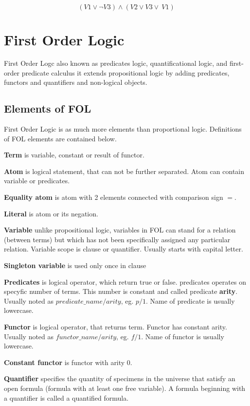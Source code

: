\begin{equation} \label{eg:PL_1}
  (V1 \lor \neg V3) \land (V2 \lor  V3 \lor ~V1)
\end{equation}


\section{First Order Logic}

First Order Logc also known as predicates logic, quantificational logic, and first-order predicate calculus it extends propositional logic by adding predicates, functors and quantifiers and non-logical objects.

\subsection{Elements of FOL}

First Order Logic is as much more elements than proportional logic. Definitions of FOL elements are contained below.

\textbf{Term}
is variable, constant or result of functor.

\textbf{Atom}
is logical statement, that can not be further separated. Atom can contain variable or predicates.

\textbf{Equality atom}
is atom with 2 elements connected with comparison sign $=$.

\textbf{Literal}
is atom or its negation.

\textbf{Variable}
unlike propositional logic, variables in \gls{FOL} can stand for a relation (between terms) but which has not been specifically assigned any particular relation.
Variable scope is clause or quantifier. Usually starts with capital letter.

\textbf{Singleton variable}
is used only once in clause

\textbf{Predicates}
is logical operator, which return true or false. predicates operates on specyfic number of terms. This number is constant and called predicate \textbf{arity}. Usually noted as $predicate\_name/arity$, eg. $p/1$. Name of predicate is usually lowercase.

\textbf{Functor}
is logical operator, that returns term. Functor has constant arity. Usually noted as $functor\_name/arity$, eg. $f/1$. Name of functor  is usually lowercase.

\textbf{Constant functor}
is functor with arity 0.

\textbf{Quantifier}
specifies the quantity of specimens in the universe that satisfy an open formula (formula with at least one free variable). A formula beginning with a quantifier is called a quantified formula.

